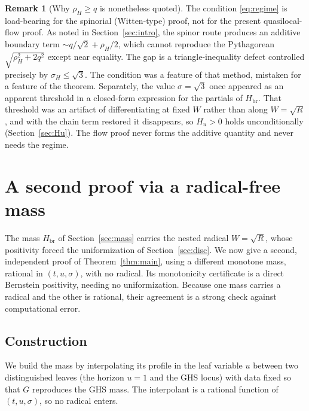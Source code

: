 \documentclass[11pt]{article}
\theoremstyle{plain}
\theoremstyle{definition}
\newtheorem{remark}[theorem]{Remark}
\newcommand{\rH}{\rho_{\!H}}
\newcommand{\Hbr}{H_{\mathrm{br}}}
\begin{document}
\begin{remark}[Why $\rH\ge q$ is nonetheless quoted]\label{rmk:spinor}
The condition \eqref{eq:regime} is load-bearing for the spinorial (Witten-type) proof, not for the present
quasilocal-flow proof. As noted in Section~\ref{sec:intro}, the spinor route produces an additive boundary
term $\sim q/\sqrt2+\rH/2$, which cannot reproduce the Pythagorean $\sqrt{\rH^2+2q^2}$ except near equality. The
gap is a triangle-inequality defect controlled precisely by $\sigma_H\le\sqrt3$. The condition was a feature
of that method, mistaken for a feature of the theorem. Separately, the value $\sigma=\sqrt3$ once appeared as an
apparent threshold in a closed-form expression for the partials of $\Hbr$. That threshold was an artifact of
differentiating at fixed $W$ rather than along $W=\sqrt R$, and with the chain term restored it disappears, so
$H_u>0$ holds unconditionally (Section~\ref{sec:Hu}). The flow proof never forms the additive quantity and
never needs the regime.
\end{remark}

\section{A second proof via a radical-free mass}\label{sec:rational}

The mass $\Hbr$ of Section~\ref{sec:mass} carries the nested radical $W=\sqrt R$, whose positivity forced the
uniformization of Section~\ref{sec:disc}. We now give a second, independent proof of Theorem~\ref{thm:main},
using a different monotone mass, rational in $(t,u,\sigma)$, with no radical. Its monotonicity certificate is a
direct Bernstein positivity, needing no uniformization. Because one mass carries a radical and the other is
rational, their agreement is a strong check against computational error.

\subsection{Construction}\label{sec:ratconstruct}

We build the mass by interpolating its profile in the leaf variable $u$ between two distinguished leaves (the
horizon $u=1$ and the GHS locus) with data fixed so that $G$ reproduces the GHS mass. The interpolant is a
rational function of $(t,u,\sigma)$, so no radical enters.
\end{document}
